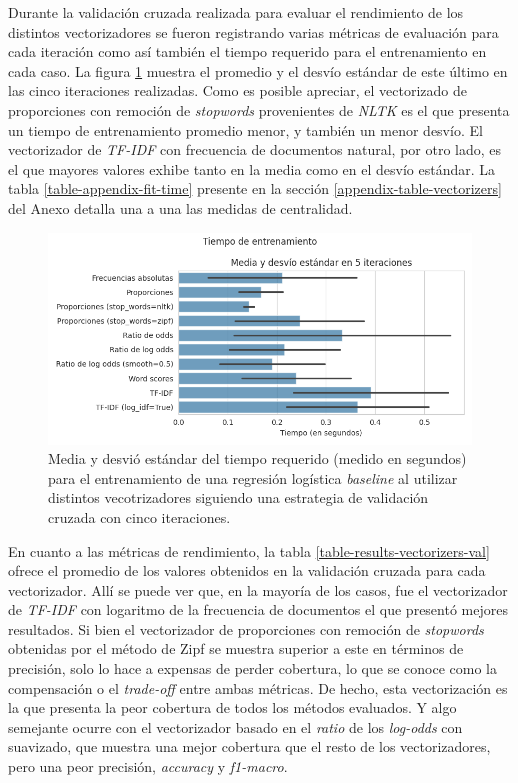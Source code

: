 Durante la validaci\'on cruzada realizada para evaluar el rendimiento de los
distintos vectorizadores se fueron registrando varias m\'etricas de evaluaci\'on
para cada iteraci\'on como as\'i tambi\'en el tiempo requerido para el entrenamiento
en cada caso. La figura \ref{fig-results-features-fit-time} muestra el promedio y el desv\'io
est\'andar de este \'ultimo en las cinco iteraciones realizadas. Como es posible
apreciar, el vectorizado de proporciones con remoci\'on de \textit{stopwords}
provenientes de \textit{NLTK} es el que presenta un tiempo de entrenamiento promedio
menor, y tambi\'en un menor desv\'io. El vectorizador de \textit{TF-IDF} con
frecuencia de documentos natural, por otro lado, es el que mayores valores
exhibe tanto en la media como en el desv\'io est\'andar. La tabla \ref{table-appendix-fit-time}
presente en la secci\'on \ref{appendix-table-vectorizers} del Anexo detalla una
a una las medidas de centralidad.

\begin{figure}[h!]
    \centering
    \includegraphics[scale=0.6]{./images/graphs/fit_time.png}
    \caption{Media y desvi\'o est\'andar del tiempo requerido (medido en segundos)
    para el entrenamiento de una regresi\'on log\'istica \textit{baseline}
    al utilizar distintos vecotrizadores siguiendo una estrategia de
    validaci\'on cruzada con cinco iteraciones.}
    \label{fig-results-features-fit-time}
\end{figure}

En cuanto a las m\'etricas de rendimiento,
la tabla \ref{table-results-vectorizers-val} ofrece el promedio de los valores
obtenidos en la validaci\'on cruzada para cada vectorizador. All\'i se puede ver que,
en la mayor\'ia de los casos, fue el vectorizador de \textit{TF-IDF} con logaritmo
de la frecuencia de documentos el que present\'o mejores resultados. Si bien el
vectorizador de proporciones con remoci\'on de \textit{stopwords} obtenidas por el
m\'etodo de Zipf se muestra superior a este en t\'erminos de precisi\'on, solo
lo hace a expensas de perder cobertura, lo que se conoce como la compensaci\'on o el
\textit{trade-off} entre ambas m\'etricas. De hecho, esta vectorizaci\'on es la que
presenta la peor cobertura de todos los m\'etodos evaluados. Y algo semejante ocurre
con el vectorizador basado en el \textit{ratio} de los \textit{log-odds} con
suavizado, que
muestra una mejor cobertura que el resto de los vectorizadores, pero una peor
precisi\'on, \textit{accuracy} y \textit{f1-macro}.

